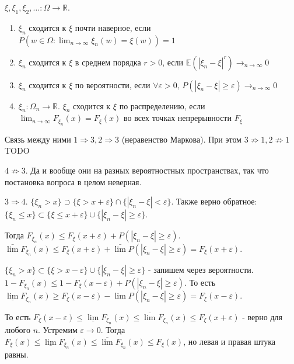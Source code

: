 \begin{definition}
    $\xi, \xi_1, \xi_2, \ldots : \Omega \to \mathbb{R}$. 

    \begin{enumerate}
        \item $\xi_n$ сходится к $\xi$ почти наверное, если $P(w \in \Omega : \lim_{n \to \infty} \xi_n(w) = \xi (w)) = 1$
        \item $\xi_n$ сходится к $\xi$ в среднем порядка $r > 0$, если $\mathbb{E} (|\xi_n - \xi|^r) \rightarrow_{n \to \infty} 0$
        \item $\xi_n$ сходится к $\xi$ по вероятности, если $\forall \varepsilon > 0,  \, P(|\xi_n - \xi| \geqslant \varepsilon) \rightarrow_{n \to \infty} 0$
        \item $\xi_n : \Omega_n \to \mathbb{R}$. $\xi_n$ сходится к $\xi$ по распределению, если 
        $\lim_{n \to \infty} F_{\xi_n} (x) = F_{\xi} (x)$ во всех точках непрерывности $F_{\xi}$
    \end{enumerate}

    Связь между ними $1 \Rightarrow 3, 2 \Rightarrow 3$ (неравенство Маркова). При этом $3 \not \Rightarrow 1, 2 \not \Rightarrow 1$
    \color{red}
      TODO      
    \color{black}

    $4 \not \Rightarrow 3$. Да и вообще они на разных вероятностных пространствах,
    так что постановка вопроса в целом неверная.

    $3 \Rightarrow 4$. $\{ \xi_n > x \} \supset \{ \xi > x+ \varepsilon \} \cap \{ |\xi_n - \xi| < \varepsilon \}$. Также верно обратное:
    $\{ \xi_n \leqslant x \} \subset \{ \xi \leqslant x+ \varepsilon \} \cup \{ |\xi_n - \xi| \geqslant \varepsilon \}$.

    Тогда $F_{\xi_n}(x) \leqslant F_{\xi}(x + \varepsilon) + P(|\xi_n - \xi| \geqslant \varepsilon)$.
    $\bar{\lim} F_{\xi_n}(x) \leqslant F_{\xi}(x + \varepsilon) + \bar{\lim} P(|\xi_n - \xi| \geqslant \varepsilon) = F_{\xi}(x + \varepsilon)$.

    $\{ \xi_n > x \} \subset \{ \xi > x - \varepsilon \} \cup \{ |\xi_n - \xi| \geqslant \varepsilon \}$ - запишем через вероятности.
    $1 - F_{\xi_n}(x) \leqslant 1 - F_{\xi}(x - \varepsilon) + P(|\xi_n - \xi| \geqslant \varepsilon)$. То есть
    $\underline{\lim} F_{\xi_n}(x) \geqslant F_{\xi}(x - \varepsilon) - \lim P(|\xi_n - \xi| \geqslant \varepsilon) = F_{\xi}(x - \varepsilon)$.

    То есть $F_{\xi}(x - \varepsilon) \leqslant \underline{\lim} F_{\xi_n}(x) \leqslant \overline{\lim} F_{\xi_n}(x) \leqslant F_{\xi}(x + \varepsilon)$ - верно для любого $n$.
    Устремим $\varepsilon \rightarrow 0$. Тогда $F_{\xi}(x) \leqslant \underline{\lim} F_{\xi_n}(x) \leqslant \overline{\lim} F_{\xi_n}(x) \leqslant F_{\xi}(x)$, но левая и правая штука равны.

\end{definition}


